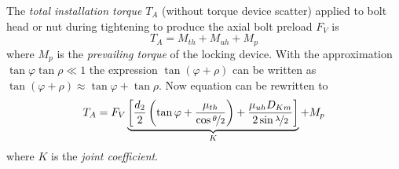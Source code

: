The \emph{total installation torque} $T_A$ (without torque device scatter) applied to bolt head or nut
during tightening to produce the axial bolt preload $F_V$ is 
\begin{equation}
  T_A = M_{th} + M_{uh} + M_p
  \label{equ:TA}
\end{equation}
where $M_p$ is the \emph{prevailing torque} of the locking device. 
With the approximation $\tan\varphi \tan\rho \ll 1$ the expression $\tan(\varphi+\rho)$ can be written
as $\tan(\varphi+\rho) \approx \tan\varphi + \tan\rho$. Now equation  can be rewritten to
\begin{equation}
  T_A = F_V \underbrace{ \left[ \frac{d_2}{2} \left( \tan\varphi + \frac{\mu_{th}}{\cos\nicefrac{\theta}{2}} \right) 
  + \frac{\mu_{uh} D_{Km}}{2 \sin\nicefrac{\lambda}{2}} \right]}_{K} + M_p
  \label{equ:TA2}
\end{equation}
where $K$ is the \emph{joint coefficient}.

